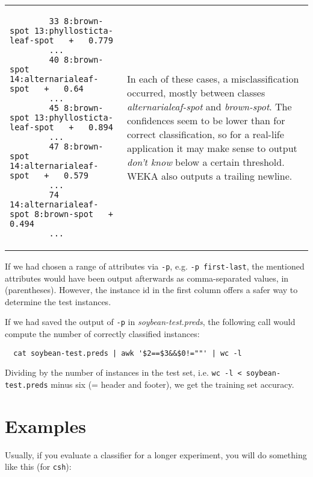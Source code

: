 \vspace{0.5cm}
\noindent
\begin{tabular}{l l}
	\begin{minipage}{8cm}
		{\scriptsize
		\begin{verbatim}
		33 8:brown-spot 13:phyllosticta-leaf-spot   +   0.779 
		...
		40 8:brown-spot 14:alternarialeaf-spot   +   0.64
		...
		45 8:brown-spot 13:phyllosticta-leaf-spot   +   0.894 
		...
		47 8:brown-spot 14:alternarialeaf-spot   +   0.579 
		...
		74 14:alternarialeaf-spot 8:brown-spot   +   0.494 
		...
		\end{verbatim}}
	\end{minipage}
	&
	\begin{minipage}{5cm}
	In each of these cases, a misclassification occurred, mostly between classes \textit{alternarialeaf-spot} and \textit{brown-spot}. The confidences seem to be lower than for correct classification, so for a real-life application it may make sense to output \textit{don't know} below a certain threshold. WEKA also outputs a trailing newline.
	\end{minipage}
	\\
\end{tabular}

\vspace{0.5cm}

If we had chosen a range of attributes via \texttt{-p}, e.g. \texttt{-p first-last}, the mentioned attributes would have been output afterwards as comma-separated values, in (parentheses). However, the instance id in the first column offers a safer way to determine the test instances.

If we had saved the output of \texttt{-p} in \textit{soybean-test.preds}, the following call would compute the number of correctly classified instances:

{\scriptsize
\begin{verbatim}
  cat soybean-test.preds | awk '$2==$3&&$0!=""' | wc -l
\end{verbatim}}

\noindent Dividing by the number of instances in the test set, i.e. \texttt{wc -l < soybean-test.preds} minus six (= header and footer), we get the training set accuracy.

\section{Examples}

Usually, if you evaluate a classifier for a longer experiment, you will do something like this (for \texttt{csh}):

